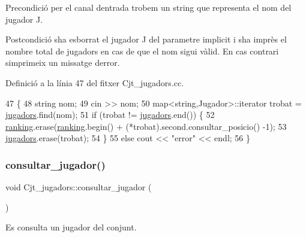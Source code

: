 \begin{DoxyPrecond}{Precondició}
per el canal d\textquotesingle{}entrada trobem un string que representa el nom del jugador J. 
\end{DoxyPrecond}
\begin{DoxyPostcond}{Postcondició}
s\textquotesingle{}ha esborrat el jugador J del parametre implicit i s\textquotesingle{}ha imprès el nombre total de jugadors en cas de que el nom sigui vàlid. En cas contrari s\textquotesingle{}imprimeix un missatge d\textquotesingle{}error. 
\end{DoxyPostcond}


Definició a la línia 47 del fitxer Cjt\+\_\+jugadors.\+cc.


\begin{DoxyCode}
47                                  \{
48     \textcolor{keywordtype}{string} nom;
49     cin >> nom;
50     map<string,Jugador>::iterator trobat = \mbox{\hyperlink{class_cjt__jugadors_a9a7fd899cca7f3c126120c8e7b4719d4}{jugadors}}.find(nom); 
51     \textcolor{keywordflow}{if} (trobat != \mbox{\hyperlink{class_cjt__jugadors_a9a7fd899cca7f3c126120c8e7b4719d4}{jugadors}}.end()) \{
52         \mbox{\hyperlink{class_cjt__jugadors_af9f7e71820fb657bf489ce72a31e8034}{ranking}}.erase(\mbox{\hyperlink{class_cjt__jugadors_af9f7e71820fb657bf489ce72a31e8034}{ranking}}.begin() + (*trobat).second.consultar\_posicio() -1);
53         \mbox{\hyperlink{class_cjt__jugadors_a9a7fd899cca7f3c126120c8e7b4719d4}{jugadors}}.erase(trobat);
54     \}
55     \textcolor{keywordflow}{else} cout << \textcolor{stringliteral}{"error"} << endl;
56 \}
\end{DoxyCode}
\mbox{\label{class_cjt__jugadors_a2232be18d9336daa80680ee29a5e9f28}} 
\subsubsection{\texorpdfstring{consultar\+\_\+jugador()}{consultar\_jugador()}}
{\footnotesize\ttfamily void Cjt\+\_\+jugadors\+::consultar\+\_\+jugador (\begin{DoxyParamCaption}{ }\end{DoxyParamCaption})}



Es consulta un jugador del conjunt. 

